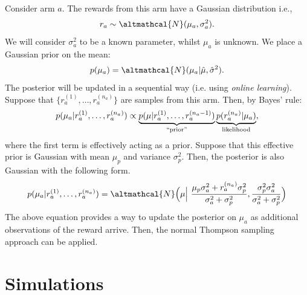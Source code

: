 \documentclass[a4paper]{article}
\begin{document}
	Consider arm $a$. The rewards from this arm have a Gaussian distribution i.e., 
	\begin{align}
	r_a \sim \altmathcal{N}(\mu_a, \sigma_a^2).
	\end{align} 
	We will consider $\sigma_a^2$ to be a known parameter, whilst $\mu_a$ is unknown. We place a Gaussian prior on the mean:
	\begin{align}
	p(\mu_a) = \altmathcal{N}(\mu_a | \hat{\mu}, \hat{\sigma}^2).
	\end{align}
	The posterior will be updated in a sequential way (i.e. using \emph{online learning}). Suppose that $\lbrace r_a^{(1)}, \ldots, r_a^{(n_a)} \rbrace$ are samples from this arm. Then, by Bayes' rule:
	\begin{align}
	p(\mu_a | r_a^{(1)}, \ldots, r_a^{(n_a)}) \propto \underbrace{p(\mu | r_a^{(1)}, \ldots, r_a^{(n_a - 1)})}_{``\text{prior}"}  \underbrace{p( r_a^{(n_a)} | \mu_a)}_{\text{likelihood}},
	\end{align}
	where the first term is effectively acting as a prior. Suppose that this effective prior is Gaussian with mean $\mu_p$ and variance $\sigma_p^2$. Then, the posterior is also Gaussian with the following form. 
	\begin{align}
	p(\mu_a | r_a^{(1)}, \ldots, r_a^{(n_a)}) = \altmathcal{N} \Big( \mu \Big|\ \frac{\mu_p \sigma_a^2 + r_a^{(n_a)} \sigma_p^2 }{\sigma_a^2 + \sigma_p^2}, \frac{\sigma_p^2 \sigma_a^2}{\sigma_a^2 + \sigma_p^2} \Big)
	\end{align}
	The above equation provides a way to update the posterior on $\mu_a$ as additional observations of the reward arrive. Then, the normal Thompson sampling approach can be applied. 
	
	\section{Simulations}
\end{document}
